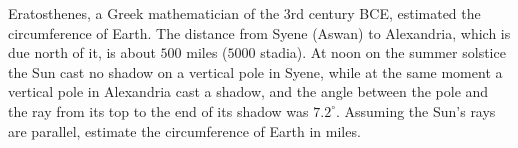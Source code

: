 Eratosthenes, a Greek mathematician of the 3rd century BCE, estimated the circumference of Earth. The distance from Syene (Aswan) to Alexandria, which is due north of it, is about $500$ miles ($5000$ stadia). At noon on the summer solstice the Sun cast no shadow on a vertical pole in Syene, while at the same moment a vertical pole in Alexandria cast a shadow, and the angle between the pole and the ray from its top to the end of its shadow was $7.2^\circ$. Assuming the Sun's rays are parallel, estimate the circumference of Earth in miles.
